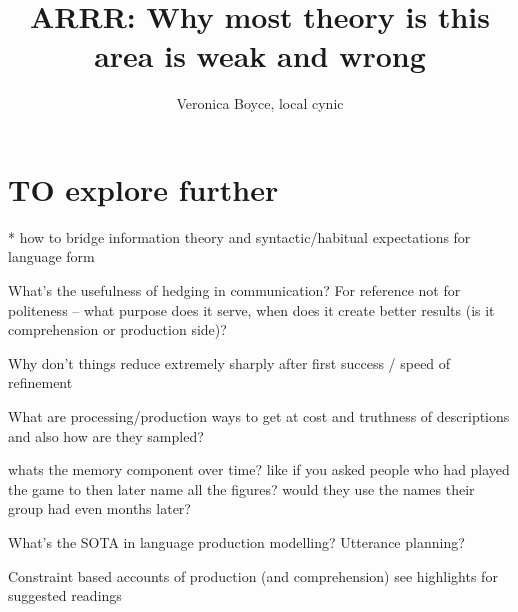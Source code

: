 \documentclass[]{article}
\title{ARRR: Why most theory is this area is weak and wrong}
\author{Veronica Boyce, local cynic}
\begin{document}
\maketitle
\section{TO explore further }

* how to bridge information theory and syntactic/habitual expectations for language form 

What's the usefulness of hedging in communication? For reference not for politeness -- what purpose does it serve, when does it create better results (is it comprehension or production side)? 

Why don't things reduce extremely sharply after first success / speed of refinement

What are processing/production ways to get at cost and truthness of descriptions and also how are they sampled? 

whats the memory component over time? like if you asked people who had played the game to then later name all the figures? would they use the names their group had even months later? 











What's the SOTA in language production modelling? Utterance planning? 

Constraint based accounts of production (and comprehension) see \cite{hanna2003} highlights for suggested readings
\end{document}

